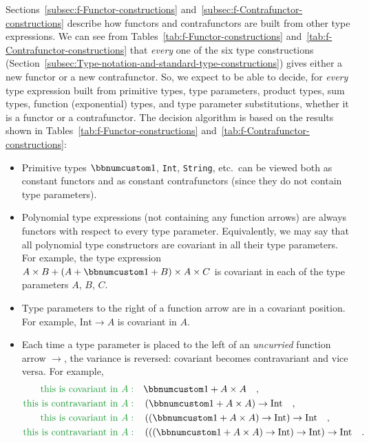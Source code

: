 Sections~\ref{subsec:f-Functor-constructions} and~\ref{subsec:f-Contrafunctor-constructions}
describe how functors and contrafunctors are built from other type
expressions. We can see from Tables~\ref{tab:f-Functor-constructions}
and~\ref{tab:f-Contrafunctor-constructions} that \emph{every} one
of the six type constructions (Section~\ref{subsec:Type-notation-and-standard-type-constructions})
gives either a new functor or a new contrafunctor. So, we expect to
be able to decide, for \emph{every} type expression built from primitive
types, type parameters, product types, sum types, function (exponential)
types, and type parameter substitutions, whether it is a functor or
a contrafunctor. The decision algorithm is based on the results shown
in Tables~\ref{tab:f-Functor-constructions} and~\ref{tab:f-Contrafunctor-constructions}:
\begin{itemize}
\item Primitive types $\bbnum 1$, \lstinline!Int!, \lstinline!String!,
etc.~can be viewed both as constant functors and as constant contrafunctors
(since they do not contain type parameters).
\item Polynomial type expressions (not containing any function arrows) are
always functors with respect to every type
parameter. Equivalently, we may say that all polynomial type constructors
are covariant in all their type parameters. For example, the type
expression $A\times B+\left(A+\bbnum 1+B\right)\times A\times C$
is covariant in each of the type parameters $A$, $B$, $C$.
\item Type parameters to the right of a function arrow are in a covariant
position. For example, $\text{Int}\rightarrow A$ is covariant in
$A$.
\item Each time a type parameter is placed to the left of an \emph{uncurried}
function arrow $\rightarrow$, the variance is reversed: covariant
becomes contravariant and vice versa. For example,
\begin{align*}
{\color{greenunder}\text{this is covariant in }A:}\quad & \bbnum 1+A\times A\quad,\\
{\color{greenunder}\text{this is contravariant in }A:}\quad & \left(\bbnum 1+A\times A\right)\rightarrow\text{Int}\quad,\\
{\color{greenunder}\text{this is covariant in }A:}\quad & \left(\left(\bbnum 1+A\times A\right)\rightarrow\text{Int}\right)\rightarrow\text{Int}\quad,\\
{\color{greenunder}\text{this is contravariant in }A:}\quad & \left(\left(\left(\bbnum 1+A\times A\right)\rightarrow\text{Int}\right)\rightarrow\text{Int}\right)\rightarrow\text{Int}\quad.

\end{align*}
\end{itemize}
